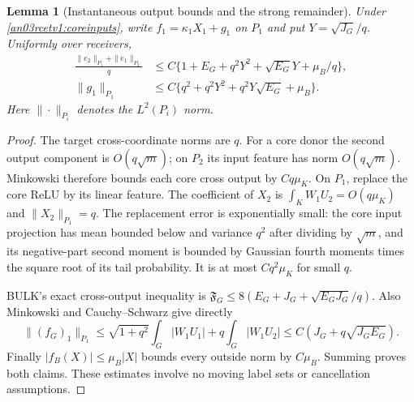 \documentclass[11pt]{article}
\newtheorem{lemma}[theorem]{Lemma}
\begin{document}
\begin{lemma}[Instantaneous output bounds and the strong remainder]
\label{an03rcetv1:outputs}
Under \eqref{an03rcetv1:coreinputs}, write $f_1=\kappa_1X_1+g_1$
on $P_1$ and put $Y=\sqrt{J_G}/q$. Uniformly over receivers,
\begin{align}
 \frac{\|e_2\|_{P_1}+\|e_1\|_{P_2}}q
 &\le C\{1+E_G+q^2Y^2+\sqrt{E_G}Y+\mu_B/q\},
 \label{an03rcetv1:crossnorm}\\
 \|g_1\|_{P_1}&\le C\{q^2+q^2Y^2+q^2Y\sqrt{E_G}+\mu_B\}.
 \label{an03rcetv1:g1}
\end{align}
Here $\|\cdot\|_{P_i}$ denotes the $L^2(P_i)$ norm.
\end{lemma}
\begin{proof}
The target cross-coordinate norms are $q$. For a core donor the
second output component is $O(q\sqrt m)$; on $P_2$ its input
feature has norm $O(q\sqrt m)$. Minkowski therefore bounds each
core cross output by $Cq\mu_K$.
On $P_1$, replace the core ReLU by its linear feature. The coefficient
of $X_2$ is $\int_K W_1U_2=O(q\mu_K)$ and $\|X_2\|_{P_1}=q$.
The replacement error is exponentially small: the core input
projection has mean bounded below and variance $q^2$ after dividing
by $\sqrt m$, and its negative-part second moment is bounded by
Gaussian fourth moments times the square root of its tail probability.
It is at most $Cq^2\mu_K$ for small $q$.

BULK's exact cross-output inequality is
$\mathfrak F_G\le8(E_G+J_G+\sqrt{E_GJ_G}/q)$.
Also Minkowski and Cauchy--Schwarz give directly
\[
 \|(f_G)_1\|_{P_1}
 \le\sqrt{1+q^2}\int_G|W_1U_1|
       +q\int_G|W_1U_2|
 \le C(J_G+q\sqrt{J_GE_G}).
\]
Finally $|f_B(X)|\le\mu_B|X|$ bounds every outside norm by
$C\mu_B$. Summing proves both claims. These estimates involve no
moving label sets or cancellation assumptions.
\end{proof}
\end{document}
